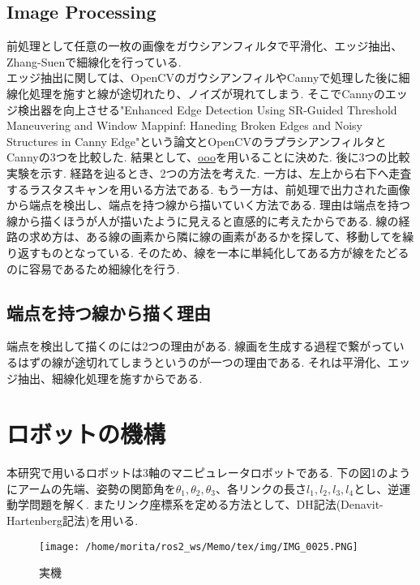 \documentclass[a4j]{jarticle}			%
\begin{document}
\begin{multicols}{2}
\subsection{Image Processing}
前処理として任意の一枚の画像をガウシアンフィルタで平滑化、エッジ抽出、Zhang-Suenで細線化を行っている.\\ 
エッジ抽出に関しては、OpenCVのガウシアンフィルやCannyで処理した後に細線化処理を施すと線が途切れたり、ノイズが現れてしまう.
そこでCannyのエッジ検出器を向上させる"Enhanced Edge Detection Using SR-Guided Threshold Maneuvering and Window Mappinf: Haneding Broken Edges and Noisy Structures in Canny Edge"という論文とOpenCVのラプラシアンフィルタとCannyの3つを比較した.
結果として、\underline{ooo}を用いることに決めた.
後に3つの比較実験を示す.
経路を辿るとき、2つの方法を考えた.
一方は、左上から右下へ走査するラスタスキャンを用いる方法である.
もう一方は、前処理で出力された画像から端点を検出し、端点を持つ線から描いていく方法である.
理由は端点を持つ線から描くほうが人が描いたように見えると直感的に考えたからである.
線の経路の求め方は、ある線の画素から隣に線の画素があるかを探して、移動してを繰り返すものとなっている.
そのため、線を一本に単純化してある方が線をたどるのに容易であるため細線化を行う.


\subsection{端点を持つ線から描く理由}
端点を検出して描くのには2つの理由がある.
線画を生成する過程で繋がっているはずの線が途切れてしまうというのが一つの理由である.
それは平滑化、エッジ抽出、細線化処理を施すからである.

\end{multicols}
\section{ロボットの機構}
本研究で用いるロボットは3軸のマニピュレータロボットである.
下の図1のようにアームの先端、姿勢の関節角を$\theta_1, \theta_2, \theta_3$、各リンクの長さ$l_1, l_2, l_3, l_4$とし、逆運動学問題を解く.
またリンク座標系を定める方法として、DH記法(Denavit-Hartenberg記法)を用いる.


\begin{figure}[htbp]
\begin{center}
\texttt{[image: /home/morita/ros2\_ws/Memo/tex/img/IMG\_0025.PNG]}
\caption{実機}
\end{center}
\end{figure}
\end{document}
